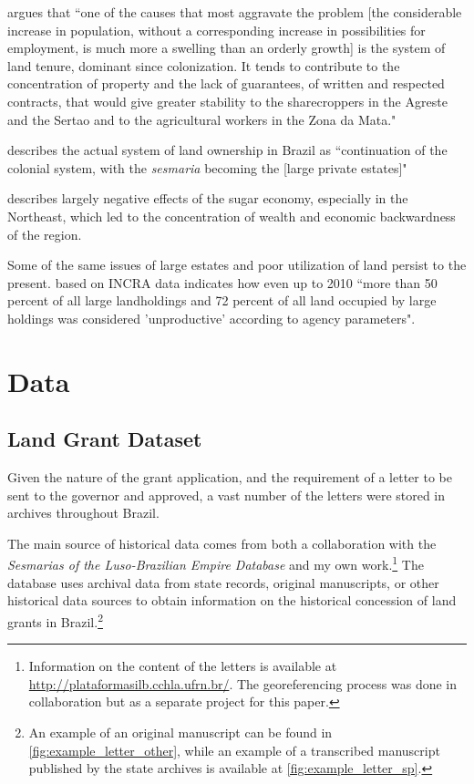 \documentclass{article}
\begin{document}
\textcite[p.~34-35]{De_Oliveira_Andrade1980-xz} argues that 
``one of the causes that most aggravate the problem [the considerable increase in population, without a corresponding increase in possibilities for employment, is much more a swelling than an orderly growth] is the system of land tenure, dominant since colonization. It tends to contribute to the concentration of property and the lack of guarantees, of written and respected contracts, that would give greater stability to the sharecroppers in the Agreste and the Sertao and to the agricultural workers in the Zona da Mata."

\textcite[p.~18]{Andrade1980-zd} describes the actual system of land ownership in Brazil as ``continuation of the colonial system, with the \textit{sesmaria} becoming the [large private estates]"

\textcite[p.~16]{Baer2014-gh} describes largely negative effects of the sugar economy, especially in the Northeast, which led to the concentration of wealth and economic backwardness of the region.

Some of the same issues of large estates and poor utilization of land persist to the present. \textcite{Carlson2019-mk} based on INCRA data indicates how even up to 2010 ``more than 50 percent of all large landholdings and 72 percent of all land occupied by large holdings was considered 'unproductive' according to agency parameters".

\section{Data}

\subsection{Land Grant Dataset}

Given the nature of the grant application, and the requirement of a letter to be sent to the governor and approved, a vast number of the letters were stored in archives throughout Brazil. 

The main source of historical data comes from both a collaboration with the \textit{Sesmarias of the Luso-Brazilian Empire Database} and my own work.\footnote{
  Information on the content of the letters is available at \url{http://plataformasilb.cchla.ufrn.br/}. The georeferencing process was done in collaboration but as a separate project for this paper.}
The database uses archival data from state records, original manuscripts, or other historical data sources to obtain information on the historical concession of land grants in Brazil.\footnote{An example of an original manuscript can be found in \autoref{fig:example_letter_other}, while an example of a transcribed manuscript published by the state archives is available at \autoref{fig:example_letter_sp}.}
\end{document}
